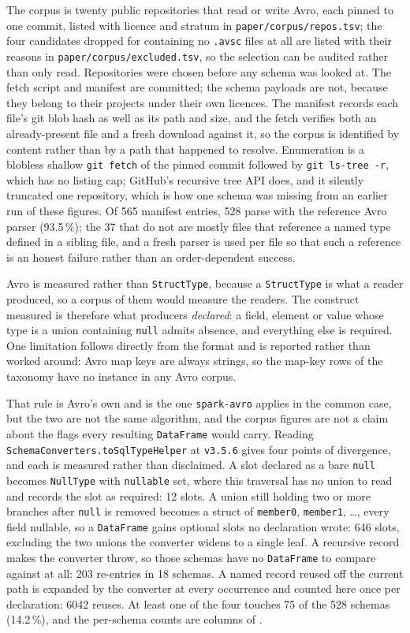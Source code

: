 The corpus is twenty public repositories that read or write Avro, each pinned to one commit, listed with licence and stratum in \texttt{paper/corpus/repos.tsv}; the four candidates dropped for containing no \texttt{.avsc} files at all are listed with their reasons in \texttt{paper/corpus/excluded.tsv}, so the selection can be audited rather than only read. Repositories were chosen before any schema was looked at. The fetch script and manifest are committed; the schema payloads are not, because they belong to their projects under their own licences. The manifest records each file's git blob hash as well as its path and size, and the fetch verifies both an already-present file and a fresh download against it, so the corpus is identified by content rather than by a path that happened to resolve. Enumeration is a blobless shallow \texttt{git fetch} of the pinned commit followed by \texttt{git ls-tree -r}, which has no listing cap; GitHub's recursive tree API does, and it silently truncated one repository, which is how one schema was missing from an earlier run of these figures. Of 565 manifest entries, 528 parse with the reference Avro parser (93.5\,\%); the 37 that do not are mostly files that reference a named type defined in a sibling file, and a fresh parser is used per file so that such a reference is an honest failure rather than an order-dependent success.

Avro is measured rather than \texttt{StructType}, because a \texttt{StructType} is what a reader produced, so a corpus of them would measure the readers. The construct measured is therefore what producers \emph{declared}: a field, element or value whose type is a union containing \texttt{null} admits absence, and everything else is required. One limitation follows directly from the format and is reported rather than worked around: Avro map keys are always strings, so the map-key rows of the taxonomy have no instance in any Avro corpus.

That rule is Avro's own and is the one \texttt{spark-avro} applies in the common case, but the two are not the same algorithm, and the corpus figures are not a claim about the flags every resulting \texttt{DataFrame} would carry. Reading \texttt{SchemaConverters.toSqlTypeHelper} at \texttt{v3.5.6} gives four points of divergence, and each is measured rather than disclaimed. A slot declared as a bare \texttt{null} becomes \texttt{NullType} with \texttt{nullable} set, where this traversal has no union to read and records the slot as required: 12 slots. A union still holding two or more branches after \texttt{null} is removed becomes a struct of \texttt{member0}, \texttt{member1}, \ldots, every field nullable, so a \texttt{DataFrame} gains optional slots no declaration wrote: 646 slots, excluding the two unions the converter widens to a single leaf. A recursive record makes the converter throw, so those schemas have no \texttt{DataFrame} to compare against at all: 203 re-entries in 18 schemas. A named record reused off the current path is expanded by the converter at every occurrence and counted here once per declaration: 6042 reuses. At least one of the four touches 75 of the 528 schemas (14.2\,\%), and the per-schema counts are columns of .

